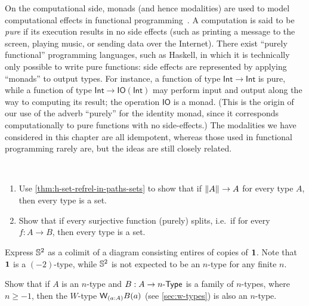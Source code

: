 On the computational side, monads (and hence modalities) are used to model computational effects in functional programming~\cite{Moggi89}.%
%
%
A computation is said to be \emph{pure} if its execution results in no side effects (such as printing a message to the screen, playing music, or sending data over the Internet).
There exist ``purely functional'' programming languages, such as Haskell, in which it is technically only possible to write pure functions: side effects are represented by applying ``monads'' to output types.
For instance, a function of type $\mathsf{Int}\to\mathsf{Int}$ is pure, while a function of type $\mathsf{Int}\to \mathsf{IO}(\mathsf{Int})$ may perform input and output along the way to computing its result; the operation $\mathsf{IO}$ is a monad.
%
(This is the origin of our use of the adverb ``purely'' for the identity monad, since it corresponds computationally to pure functions with no side-effects.)
The modalities we have considered in this chapter are all idempotent, whereas those used in functional programming rarely are, but the ideas are still closely related.


\sectionExercises

\begin{ex}\ 
  \begin{enumerate}
    \item Use \autoref{thm:h-set-refrel-in-paths-sets} to show 
    that if $\mathopen{}\left\Vert A\right\Vert_{}\mathclose{}\to A$ for every type $A$, 
    then every type is a set.
    \item Show that if every surjective function (purely) splits, 
    i.e.~if
    for every $f:A\to B$, then every type is a set.
  \end{enumerate}
\end{ex}

\begin{ex}\label{ex:s2-colim-unit}
  Express $\mathbb{S}^2$ as a colimit of a diagram consisting entires of copies of $\mathbf{1}$.
  Note that $\mathbf{1}$ is a $(-2)$-type, while $\mathbb{S}^2$ is not expected to be an $n$-type for any finite $n$.
\end{ex}

\begin{ex}\label{ex:ntypes-closed-under-wtypes}
  Show that if $A$ is an $n$-type and $B:A\to {n}\text-\mathsf{Type}$ is a family of $n$-types, where $n\ge -1$, then the $W$-type $\wtype{a:A} B(a)$ (see \autoref{sec:w-types}) is also an $n$-type.
\end{ex}


